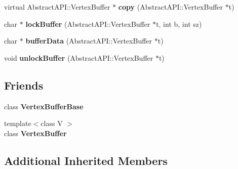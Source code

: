 \begin{DoxyCompactItemize}
\item 
\hypertarget{class_tempest_1_1_vertex_buffer_holder_ae6a2c4dbc627ec97e36bba49e2ddc0d8}{virtual Abstract\+A\+P\+I\+::\+Vertex\+Buffer $\ast$ {\bfseries copy} (Abstract\+A\+P\+I\+::\+Vertex\+Buffer $\ast$t)}\label{class_tempest_1_1_vertex_buffer_holder_ae6a2c4dbc627ec97e36bba49e2ddc0d8}

\item 
\hypertarget{class_tempest_1_1_vertex_buffer_holder_a26e485f1e3ce90987d0fcdbe212cb58c}{char $\ast$ {\bfseries lock\+Buffer} (Abstract\+A\+P\+I\+::\+Vertex\+Buffer $\ast$t, int b, int sz)}\label{class_tempest_1_1_vertex_buffer_holder_a26e485f1e3ce90987d0fcdbe212cb58c}

\item 
\hypertarget{class_tempest_1_1_vertex_buffer_holder_a6069dff2b5984af7b05b7429947ad858}{char $\ast$ {\bfseries buffer\+Data} (Abstract\+A\+P\+I\+::\+Vertex\+Buffer $\ast$t)}\label{class_tempest_1_1_vertex_buffer_holder_a6069dff2b5984af7b05b7429947ad858}

\item 
\hypertarget{class_tempest_1_1_vertex_buffer_holder_aefbbe90dca0c8ce1ce45a322037e836a}{void {\bfseries unlock\+Buffer} (Abstract\+A\+P\+I\+::\+Vertex\+Buffer $\ast$t)}\label{class_tempest_1_1_vertex_buffer_holder_aefbbe90dca0c8ce1ce45a322037e836a}

\end{DoxyCompactItemize}
\subsection*{Friends}
\begin{DoxyCompactItemize}
\item 
\hypertarget{class_tempest_1_1_vertex_buffer_holder_abac37ed5e7003ca377b2a9b9ca10a09b}{class {\bfseries Vertex\+Buffer\+Base}}\label{class_tempest_1_1_vertex_buffer_holder_abac37ed5e7003ca377b2a9b9ca10a09b}

\item 
\hypertarget{class_tempest_1_1_vertex_buffer_holder_a2c3c2b2badf0dcf00f03fbbb0923757b}{{\footnotesize template$<$class V $>$ }\\class {\bfseries Vertex\+Buffer}}\label{class_tempest_1_1_vertex_buffer_holder_a2c3c2b2badf0dcf00f03fbbb0923757b}

\end{DoxyCompactItemize}
\subsection*{Additional Inherited Members}


